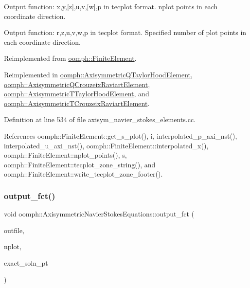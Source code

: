 Output function\+: x,y,\mbox{[}z\mbox{]},u,v,\mbox{[}w\mbox{]},p in tecplot format. nplot points in each coordinate direction. 

Output function\+: r,z,u,v,w,p in tecplot format. Specified number of plot points in each coordinate direction. 

Reimplemented from \hyperlink{classoomph_1_1FiniteElement_adfaee690bb0608f03320eeb9d110d48c}{oomph\+::\+Finite\+Element}.



Reimplemented in \hyperlink{classoomph_1_1AxisymmetricQTaylorHoodElement_a4c2fcefe0593bb39d6c4937b0fdc1292}{oomph\+::\+Axisymmetric\+Q\+Taylor\+Hood\+Element}, \hyperlink{classoomph_1_1AxisymmetricQCrouzeixRaviartElement_a04743e5848f04627a7069879f4da8389}{oomph\+::\+Axisymmetric\+Q\+Crouzeix\+Raviart\+Element}, \hyperlink{classoomph_1_1AxisymmetricTTaylorHoodElement_abc6435ee0ad7a9235b1fc57451f1872c}{oomph\+::\+Axisymmetric\+T\+Taylor\+Hood\+Element}, and \hyperlink{classoomph_1_1AxisymmetricTCrouzeixRaviartElement_aeec639f7ae884f7dd7f1d33ad63ba0b2}{oomph\+::\+Axisymmetric\+T\+Crouzeix\+Raviart\+Element}.



Definition at line 534 of file axisym\+\_\+navier\+\_\+stokes\+\_\+elements.\+cc.



References oomph\+::\+Finite\+Element\+::get\+\_\+s\+\_\+plot(), i, interpolated\+\_\+p\+\_\+axi\+\_\+nst(), interpolated\+\_\+u\+\_\+axi\+\_\+nst(), oomph\+::\+Finite\+Element\+::interpolated\+\_\+x(), oomph\+::\+Finite\+Element\+::nplot\+\_\+points(), s, oomph\+::\+Finite\+Element\+::tecplot\+\_\+zone\+\_\+string(), and oomph\+::\+Finite\+Element\+::write\+\_\+tecplot\+\_\+zone\+\_\+footer().

\mbox{\label{classoomph_1_1AxisymmetricNavierStokesEquations_a454a2d627bad75944359e90be0a535a5}} 
\subsubsection{\texorpdfstring{output\+\_\+fct()}{output\_fct()}\hspace{0.1cm}{\footnotesize\ttfamily [1/2]}}
{\footnotesize\ttfamily void oomph\+::\+Axisymmetric\+Navier\+Stokes\+Equations\+::output\+\_\+fct (\begin{DoxyParamCaption}\item[{std\+::ostream \&}]{outfile,  }\item[{const unsigned \&}]{nplot,  }\item[{\hyperlink{classoomph_1_1FiniteElement_a690fd33af26cc3e84f39bba6d5a85202}{Finite\+Element\+::\+Steady\+Exact\+Solution\+Fct\+Pt}}]{exact\+\_\+soln\+\_\+pt }\end{DoxyParamCaption})\hspace{0.3cm}{\ttfamily [virtual]}}



